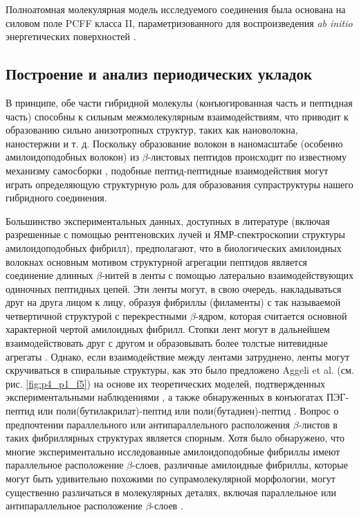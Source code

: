     Полноатомная молекулярная модель исследуемого соединения была основана на силовом поле PCFF класса II, параметризованного для воспроизведения \textit{ab initio} энергетических поверхностей \cite{sun_force_1994,maple_derivation_1994,peng_derivation_1997}.

\subsection{Построение и анализ периодических укладок}

    В принципе, обе части гибридной молекулы (конъюгированная часть и пептидная часть) способны к сильным межмолекулярным взаимодействиям, что приводит к образованию сильно анизотропных структур, таких как нановолокна, наностержни и т. д. Поскольку образование волокон в наномасштабе (особенно амилоидоподобных волокон) из $\beta$-листовых пептидов происходит по известному механизму самосборки \cite{ecroyd_crystallin_2009}, подобные пептид-пептидные взаимодействия могут играть определяющую структурную роль для образования супраструктуры нашего гибридного соединения.
    
    Большинство экспериментальных данных, доступных в литературе (включая разрешенные с помощью рентгеновских лучей и ЯМР-спектроскопии структуры амилоидоподобных фибрилл), предполагают, что в биологических амилоидных волокнах основным мотивом структурной агрегации пептидов является соединение длинных $\beta$-нитей в ленты с помощью латерально взаимодействующих одиночных пептидных цепей. Эти ленты могут, в свою очередь, накладываться друг на друга лицом к лицу, образуя фибриллы (филаменты) с так называемой четвертичной структурой с перекрестными $\beta$-ядром, которая считается основной характерной чертой амилоидных фибрилл. Стопки лент могут в дальнейшем взаимодействовать друг с другом и образовывать более толстые нитевидные агрегаты \cite{aggeli_hierarchical_2001}. Однако, если взаимодействие между лентами затруднено, ленты могут скручиваться в спиральные структуры, как это было предложено Aggeli et al. (см. рис. \ref{fig:p4_p1_f5}) на основе их теоретических моделей, подтвержденных экспериментальными наблюдениями \cite{aggeli_hierarchical_2001}, а также обнаруженных в конъюгатах ПЭГ-пептид или поли(бутилакрилат)-пептид или поли(бутадиен)-пептид \cite{hentschel_peptide-directed_2006,jahnke_molecular_2008}. Вопрос о предпочтении параллельного или антипараллельного расположения $\beta$-листов в таких фибриллярных структурах является спорным. Хотя было обнаружено, что многие экспериментально исследованные амилоидоподобные фибриллы имеют параллельное расположение $\beta$-слоев, различные амилоидные фибриллы, которые могут быть удивительно похожими по супрамолекулярной морфологии, могут существенно различаться в молекулярных деталях, включая параллельное или антипараллельное расположение $\beta$-слоев \cite{margittai_fibrils_2008}.

